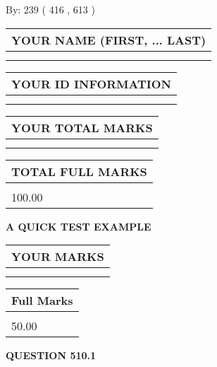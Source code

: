 \documentclass[12pt]{article}
\begin{document}
   
\hspace{1.0in} By: 
 239 ( 416 ,  613 )
   
   
   
   
\newpage 
\setcounter{page}{ 
   510001 } 
   
   
   
   
\noindent\begin{tabular}{|l|}
\hline
YOUR NAME (FIRST, ... LAST)  \\
\hline
 \\ 
 \\ 
\hline
\end{tabular}
\hspace{0.05in} \begin{tabular}{|l|}
\hline
 YOUR   ID   INFORMATION  \\
\hline
 \\ 
 \\ 
\hline
\end{tabular}
   
   
\vspace{0.2in}\noindent\begin{tabular}{|l|}
\hline
YOUR TOTAL MARKS  \\
\hline
 \\ 
 \\ 
\hline
\end{tabular}
\hspace{0.05in} \begin{tabular}{|l|}
\hline
TOTAL FULL MARKS  \\
\hline
 \\ 
100.00 \\
\hline
\end{tabular}
   
   
 \vspace{0.2in}
{\LARGE {\textbf{ A QUICK TEST EXAMPLE}}}
   
   
  
\vspace{0.2in}
  
\noindent\begin{tabular}{|l|}
\hline
 YOUR MARKS  \\
\hline
 \\ 
 \\ 
\hline
\end{tabular}
\hspace{0.05in} \begin{tabular}{|l|}
\hline
 Full Marks  \\
\hline
 \\ 
50.00 \\
\hline
\end{tabular}
{\textbf{\Large{QUESTION
510.1 
}}}
  
\end{document}
